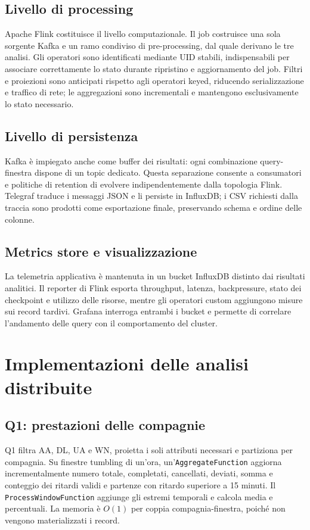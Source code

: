 \documentclass[conference]{IEEEtran}
\begin{document}
\subsection{Livello di processing}
Apache Flink costituisce il livello computazionale. Il job costruisce una sola sorgente Kafka e un ramo condiviso di pre-processing, dal quale derivano le tre analisi. Gli operatori sono identificati mediante UID stabili, indispensabili per associare correttamente lo stato durante ripristino e aggiornamento del job. Filtri e proiezioni sono anticipati rispetto agli operatori keyed, riducendo serializzazione e traffico di rete; le aggregazioni sono incrementali e mantengono esclusivamente lo stato necessario.

\subsection{Livello di persistenza}
Kafka è impiegato anche come buffer dei risultati: ogni combinazione query-finestra dispone di un topic dedicato. Questa separazione consente a consumatori e politiche di retention di evolvere indipendentemente dalla topologia Flink. Telegraf traduce i messaggi JSON e li persiste in InfluxDB; i CSV richiesti dalla traccia sono prodotti come esportazione finale, preservando schema e ordine delle colonne.

\subsection{Metrics store e visualizzazione}
La telemetria applicativa è mantenuta in un bucket InfluxDB distinto dai risultati analitici. Il reporter di Flink esporta throughput, latenza, backpressure, stato dei checkpoint e utilizzo delle risorse, mentre gli operatori custom aggiungono misure sui record tardivi. Grafana interroga entrambi i bucket e permette di correlare l'andamento delle query con il comportamento del cluster.

\section{Implementazioni delle analisi distribuite}\label{sec:queries}
\subsection{Q1: prestazioni delle compagnie}
Q1 filtra AA, DL, UA e WN, proietta i soli attributi necessari e partiziona per compagnia. Su finestre tumbling di un'ora, un'\texttt{AggregateFunction} aggiorna incrementalmente numero totale, completati, cancellati, deviati, somma e conteggio dei ritardi validi e partenze con ritardo superiore a 15 minuti. Il \texttt{ProcessWindowFunction} aggiunge gli estremi temporali e calcola media e percentuali. La memoria è $O(1)$ per coppia compagnia-finestra, poiché non vengono materializzati i record.
\end{document}
